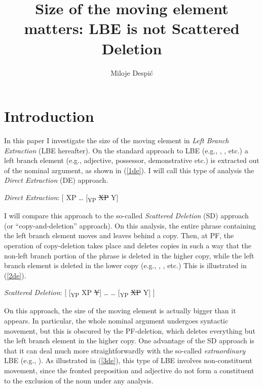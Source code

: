 \documentclass[output=paper]{langscibook}
\author{Miloje Despić\affiliation{Cornell University}}
\title{Size of the moving element matters: LBE is not Scattered Deletion}
\begin{document}
\maketitle

\section{Introduction}
In this paper I investigate the size of the moving element in \textit{Left Branch Extraction} (LBE hereafter). On the standard approach to LBE (e.g.,
\citeauthor{Riemsdijk1978}, \citeauthor{Corver1990}, \citeauthor{Boskovic2005} etc.) a left branch element (e.g., adjective, possessor, demonstrative etc.) is extracted out of the nominal argument, as shown in (\ref{1de}). I will call this type of analysis the \textit{Direct Extraction} (DE) approach.

\begin{exe}
\ex \label{1de}
\textit{Direct Extraction}: [  XP … [\textsubscript{YP}  \sout{XP}  Y]  
\end{exe}

I will compare this approach to the so-called \textit{Scattered Deletion} (SD) approach (or “copy-and-deletion” approach). On this analysis, the entire phrase containing the left branch element moves and leaves behind a copy. Then, at PF, the operation of copy-deletion takes place and deletes copies in such a way that the non-left branch portion of the phrase is deleted in the higher copy, while the left branch element is deleted in the lower copy (e.g., \citealt{FanselowCavar2002}, \citealt{Pereltsvaig2008}, \citealt{BondarenkoColin2018} etc.) This is illustrated in (\ref{2de}). 

\begin{exe}
\ex \label{2de}
\textit{Scattered Deletion}:  [  [\textsubscript{YP}  XP  \sout{Y}] … … [\textsubscript{YP} \sout{XP}  Y] ]  
\end{exe}

On this approach, the size of the moving element is actually bigger than it appears. In particular, the whole nominal argument undergoes syntactic movement, but this is obscured by the PF-deletion, which deletes everything but the left branch element in the higher copy. One advantage of the SD approach is that it can deal much more straightforwardly with the so-called \textit{extraordinary} LBE (e.g., \citealt{Boskovic2005}). As illustrated in (\ref{3de}), this type of LBE involves non-constituent movement, since the fronted preposition and adjective do not form a constituent to the exclusion of the noun under any analysis. 
\end{document}
